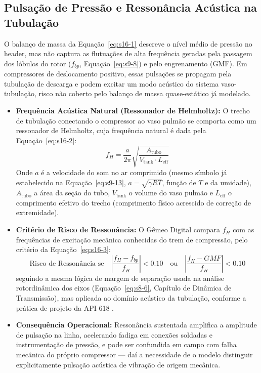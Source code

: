 \documentclass[12pt,a4paper]{article}
\numberwithin{equation}{section}
\numberwithin{table}{section}
\numberwithin{figure}{section}
\begin{document}
{\subsection{Pulsação de Pressão e Ressonância Acústica na Tubulação}
O balanço de massa da Equação~\eqref{eq:s16-1} descreve o nível médio de pressão no header, mas não captura as flutuações de alta frequência geradas pela passagem dos lóbulos do rotor ($f_{bp}$, Equação~\eqref{eq:s9-8}) e pelo engrenamento (GMF). Em compressores de deslocamento positivo, essas pulsações se propagam pela tubulação de descarga e podem excitar um modo acústico do sistema vaso-tubulação, risco não coberto pelo balanço de massa quase-estático já modelado.
\begin{itemize}
	\item \textbf{Frequência Acústica Natural (Ressonador de Helmholtz):} O trecho de tubulação conectando o compressor ao vaso pulmão se comporta como um ressonador de Helmholtz, cuja frequência natural é dada pela Equação~\eqref{eq:s16-2}:
	\begin{equation}\label{eq:s16-2}
 f_H = \frac{a}{2\pi} \sqrt{\frac{A_{\text{tubo}}}{V_{\text{tank}} \cdot L_{\text{eff}}}}
\end{equation}
	Onde $a$ é a velocidade do som no ar comprimido (mesmo símbolo já estabelecido na Equação~\eqref{eq:s9-13}, $a=\sqrt{\gamma R T}$, função de $T$ e da umidade), $A_{\text{tubo}}$ a área da seção do tubo, $V_{\text{tank}}$ o volume do vaso pulmão e $L_{\text{eff}}$ o comprimento efetivo do trecho (comprimento físico acrescido de correção de extremidade).
	\item \textbf{Critério de Risco de Ressonância:} O Gêmeo Digital compara $f_H$ com as frequências de excitação mecânica conhecidas do trem de compressão, pelo critério da Equação~\eqref{eq:s16-3}:
	\begin{equation}\label{eq:s16-3}
 \text{Risco de Ressonância se} \quad \left| \frac{f_H - f_{bp}}{f_H} \right| < 0.10 \quad \text{ou} \quad \left| \frac{f_H - GMF}{f_H} \right| < 0.10 
\end{equation}
	seguindo a mesma lógica de margem de separação usada na análise rotordinâmica dos eixos (Equação~\eqref{eq:s8-6}, Capítulo de Dinâmica de Transmissão), mas aplicada ao domínio acústico da tubulação, conforme a prática de projeto da API 618 \cite{api618}.
	\item \textbf{Consequência Operacional:} Ressonância sustentada amplifica a amplitude de pulsação na linha, acelerando fadiga em conexões soldadas e instrumentação de pressão, e pode ser confundida em campo com falha mecânica do próprio compressor — daí a necessidade de o modelo distinguir explicitamente pulsação acústica de vibração de origem mecânica.

\end{itemize}}
\end{document}

